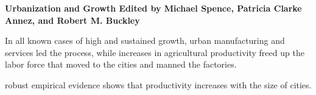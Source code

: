  \vspace{1cm}
\textbf{Urbanization and Growth Edited by Michael Spence, Patricia Clarke Annez, and Robert M. Buckley}

 In all known cases of high and sustained growth, urban manufacturing and services led the process, while increases in agricultural productivity freed up the labor force that moved to the cities and manned the factories. 

 robust empirical evidence shows that productivity increases with the size of cities. 